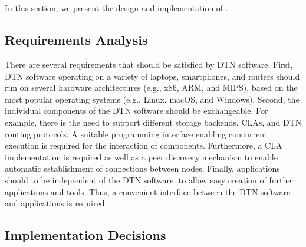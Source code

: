 \section{\dtn}
\label{sec:implementation}

In this section, we present the design and implementation of \dtn. 

\subsection{Requirements Analysis}
There are several requirements that should be satisfied by DTN software. First, DTN software operating on a variety of laptops, smartphones, and routers should run on several hardware architectures (e.g., x86, ARM, and MIPS), based on the most popular operating systems (e.g., Linux, macOS, and Windows).
Second, the individual components of the DTN software should be exchangeable.
For example, there is the need to support different storage backends, CLAs, and DTN routing protocols.
A suitable programming interface enabling concurrent execution is required for the interaction of components.  
Furthermore, a CLA implementation is required as well as a peer discovery mechanism to enable automatic establishment of connections between nodes.
Finally, applications should to be independent of the DTN software, to allow easy creation of further applications and tools.
Thus, a convenient interface between the DTN software and applications is required.



\subsection{Implementation Decisions}

